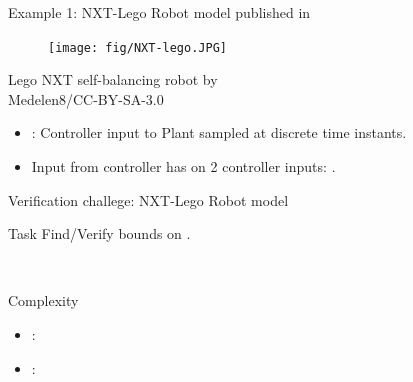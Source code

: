 \begin{frame}{Example 1: NXT-Lego Robot model}
 published in  

\begin{minipage}{0.3\textwidth}
\begin{figure}
\centering
\texttt{[image: fig/NXT-lego.JPG]}
\end{figure}
\end{minipage}
\begin{minipage}{0.6\textwidth}
{\footnotesize Lego NXT self-balancing robot by\\ Medelen8/CC-BY-SA-3.0}
\begin{itemize}
\item {}: Controller input to Plant sampled at discrete time instants.
\item Input from controller has  on {\color{violet} 2 controller inputs}: .
\end{itemize}
\end{minipage}

\end{frame}


\begin{frame}{Verification challege: NXT-Lego Robot model}
\begin{alertblock}{Task}
Find/Verify bounds on .
\end{alertblock}
%
\\
%
\begin{block}{Complexity}
\begin{itemize}
\item {}: 
\item {}: 
\end{itemize}
\end{block}
%
\end{frame}

